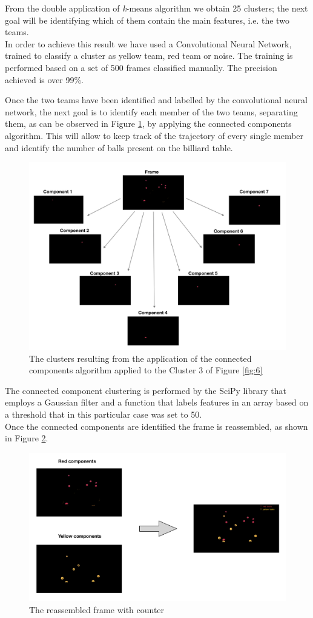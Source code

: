 \documentclass{usiinftr}
\begin{document}
\noindent
From the double application of \textit{k}-means algorithm we obtain 25 clusters; the next goal will be identifying which of them contain the main features, i.e. the two teams. \\
In order to achieve this result we have used a Convolutional Neural Network, trained to classify a cluster as yellow team, red team or noise. The training is performed based on a set of 500 frames classified manually. The precision achieved is over 99\%.

\noindent
Once the two teams have been identified and labelled by the convolutional neural network, the next goal is to identify each member of the two teams, separating them, as can be observed in Figure \ref{fig:7}, by applying the connected components algorithm. This will allow to keep track of the trajectory of every single member and identify the number of balls present on the billiard table.
\begin{figure}[h]
	\centering
	\includegraphics[width=0.6\linewidth]{./img/cc}
	\caption{The clusters resulting from the application of the connected components algorithm applied to the Cluster 3 of Figure \ref{fig:6}}
	\label{fig:7}
\end{figure}

\noindent
The connected component clustering is performed by the SciPy library that employs a Gaussian filter and a function that labels features in an array based on a threshold that in this particular case was set to 50. \\
Once the connected components are identified the frame is reassembled, as shown in Figure \ref{fig:8}. 
\begin{figure}[h]
	\centering
	\includegraphics[width=0.7\linewidth]{./img/to_frame}
	\caption{The reassembled frame with counter}
	\label{fig:8}
\end{figure}
\end{document}
